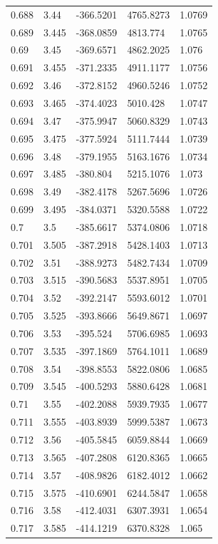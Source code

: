 \begin{tabular}{lllll}
0.688 & 3.44 & -366.5201 & 4765.8273 & 1.0769 \\
0.689 & 3.445 & -368.0859 & 4813.774 & 1.0765 \\
0.69 & 3.45 & -369.6571 & 4862.2025 & 1.076 \\
0.691 & 3.455 & -371.2335 & 4911.1177 & 1.0756 \\
0.692 & 3.46 & -372.8152 & 4960.5246 & 1.0752 \\
0.693 & 3.465 & -374.4023 & 5010.428 & 1.0747 \\
0.694 & 3.47 & -375.9947 & 5060.8329 & 1.0743 \\
0.695 & 3.475 & -377.5924 & 5111.7444 & 1.0739 \\
0.696 & 3.48 & -379.1955 & 5163.1676 & 1.0734 \\
0.697 & 3.485 & -380.804 & 5215.1076 & 1.073 \\
0.698 & 3.49 & -382.4178 & 5267.5696 & 1.0726 \\
0.699 & 3.495 & -384.0371 & 5320.5588 & 1.0722 \\
0.7 & 3.5 & -385.6617 & 5374.0806 & 1.0718 \\
0.701 & 3.505 & -387.2918 & 5428.1403 & 1.0713 \\
0.702 & 3.51 & -388.9273 & 5482.7434 & 1.0709 \\
0.703 & 3.515 & -390.5683 & 5537.8951 & 1.0705 \\
0.704 & 3.52 & -392.2147 & 5593.6012 & 1.0701 \\
0.705 & 3.525 & -393.8666 & 5649.8671 & 1.0697 \\
0.706 & 3.53 & -395.524 & 5706.6985 & 1.0693 \\
0.707 & 3.535 & -397.1869 & 5764.1011 & 1.0689 \\
0.708 & 3.54 & -398.8553 & 5822.0806 & 1.0685 \\
0.709 & 3.545 & -400.5293 & 5880.6428 & 1.0681 \\
0.71 & 3.55 & -402.2088 & 5939.7935 & 1.0677 \\
0.711 & 3.555 & -403.8939 & 5999.5387 & 1.0673 \\
0.712 & 3.56 & -405.5845 & 6059.8844 & 1.0669 \\
0.713 & 3.565 & -407.2808 & 6120.8365 & 1.0665 \\
0.714 & 3.57 & -408.9826 & 6182.4012 & 1.0662 \\
0.715 & 3.575 & -410.6901 & 6244.5847 & 1.0658 \\
0.716 & 3.58 & -412.4031 & 6307.3931 & 1.0654 \\
0.717 & 3.585 & -414.1219 & 6370.8328 & 1.065 \\

\end{tabular}
